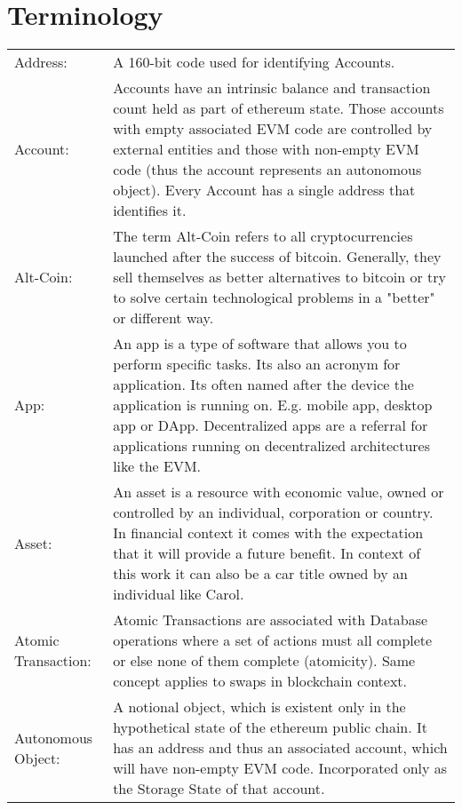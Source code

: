 \chapter{Terminology}
\label{ch:chapter06}

\begin{center}
	\begin{tabular}{ p{4cm} p{8cm} } 
		Address: & A 160-bit code used for identifying Accounts.  \\ 
		Account: & Accounts have an intrinsic balance and transaction count held as part of ethereum state. Those accounts with empty associated \ac{EVM} code are controlled by external entities and those with non-empty \ac{EVM} code (thus the account represents an autonomous object). Every Account has a single address that identifies it. \\
		Alt-Coin: & The term Alt-Coin refers to all cryptocurrencies launched after the success of bitcoin. Generally, they sell themselves as better alternatives to bitcoin or try to solve certain technological problems in a "better" or different way. \\
		App: & An app is a type of software that allows you to perform specific tasks. Its also an acronym for application. Its often named after the device the application is running on. E.g. mobile app, desktop app or \ac{DApp}. Decentralized apps are a referral for applications running on decentralized architectures like the \ac{EVM}. \\
		Asset: & An asset is a resource with economic value, owned or controlled by an individual, corporation or country. In financial context it comes with the expectation that it will provide a future benefit. In context of this work it can also be a car title owned by an individual like Carol.\\
		Atomic Transaction: & Atomic Transactions are associated with Database operations where a set of actions must all complete or else none of them complete (atomicity). Same concept applies to swaps in blockchain context. \\
		Autonomous Object: & A notional object, which is existent only in the hypothetical state of the ethereum public chain. It has an address and thus an associated account, which will have non-empty \ac{EVM} code. Incorporated only as the Storage State of that account. \\
	\end{tabular}
\end{center}


